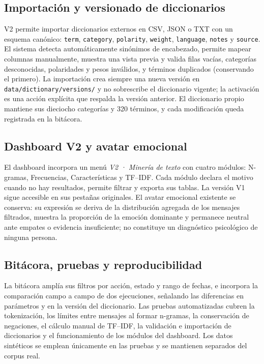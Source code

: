 

\subsection{Importación y versionado de diccionarios}

V2 permite importar diccionarios externos en CSV, JSON o TXT con un esquema canónico:
\texttt{term}, \texttt{category}, \texttt{polarity}, \texttt{weight}, \texttt{language},
\texttt{notes} y \texttt{source}. El sistema detecta automáticamente sinónimos de
encabezado, permite mapear columnas manualmente, muestra una vista previa y valida filas
vacías, categorías desconocidas, polaridades y pesos inválidos, y términos duplicados
(conservando el primero). La importación crea siempre una nueva versión en
\texttt{data/dictionary/versions/} y no sobrescribe el diccionario vigente; la activación
es una acción explícita que respalda la versión anterior. El diccionario propio mantiene
sus dieciocho categorías y 320 términos, y cada modificación queda registrada en la
bitácora.

\subsection{Dashboard V2 y avatar emocional}

El dashboard incorpora un menú \emph{V2 · Minería de texto} con cuatro módulos:
N-gramas, Frecuencias, Características y TF--IDF. Cada módulo declara el motivo cuando no
hay resultados, permite filtrar y exporta sus tablas. La versión V1 sigue accesible en sus
pestañas originales. El avatar emocional existente se conserva: su expresión se deriva de
la distribución agregada de los mensajes filtrados, muestra la proporción de la emoción
dominante y permanece neutral ante empates o evidencia insuficiente; no constituye un
diagnóstico psicológico de ninguna persona.

\subsection{Bitácora, pruebas y reproducibilidad}

La bitácora amplía sus filtros por acción, estado y rango de fechas, e incorpora la
comparación campo a campo de dos ejecuciones, señalando las diferencias en parámetros y
en la versión del diccionario. Las pruebas automatizadas cubren la tokenización, los
límites entre mensajes al formar n-gramas, la conservación de negaciones, el cálculo
manual de TF--IDF, la validación e importación de diccionarios y el funcionamiento de los
módulos del dashboard. Los datos sintéticos se emplean únicamente en las pruebas y se
mantienen separados del corpus real.
